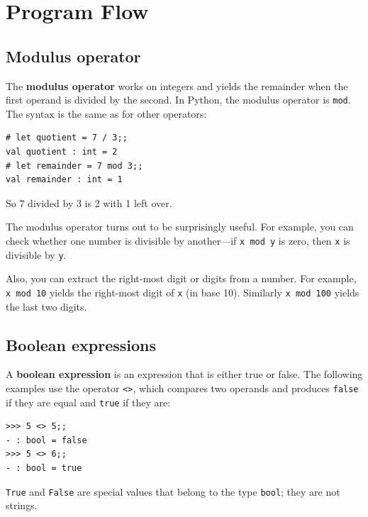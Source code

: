 \documentclass[10pt]{book}
\begin{document}

\chapter{Program Flow}

\section{Modulus operator}


The {\bf modulus operator} works on integers and yields the remainder
when the first operand is divided by the second.  In Python, the
modulus operator is {\tt mod}. The syntax is the same
as for other operators:

\beforeverb
\begin{verbatim}
# let quotient = 7 / 3;;
val quotient : int = 2
# let remainder = 7 mod 3;;
val remainder : int = 1
\end{verbatim}
\afterverb
%
So 7 divided by 3 is 2 with 1 left over.

The modulus operator turns out to be surprisingly useful.  For
example, you can check whether one number is divisible by another---if
{\tt x mod y} is zero, then {\tt x} is divisible by {\tt y}.


Also, you can extract the right-most digit
or digits from a number.  For example, {\tt x mod 10} yields the
right-most digit of {\tt x} (in base 10).  Similarly {\tt x mod 100}
yields the last two digits.


\section{Boolean expressions}

A {\bf boolean expression} is an expression that is either true
or false.  The following examples use the 
operator {\tt <>}, which compares two operands and produces
{\tt false} if they are equal and {\tt true} if they are:

\beforeverb
\begin{verbatim}
>>> 5 <> 5;;
- : bool = false
>>> 5 <> 6;;
- : bool = true
\end{verbatim}
\afterverb
%
{\tt True} and {\tt False} are special
values that belong to the type {\tt bool}; they are not strings.
\end{document}
